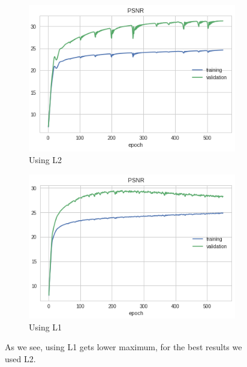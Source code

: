 \documentclass[12pt]{article}
\begin{document}
\begin{figure}[h!]
  \centering
  \begin{subfigure}[b]{0.4\linewidth}
    \includegraphics[width=\linewidth]{psnradam1d.png}
    \caption{Using L2}
  \end{subfigure}
  \begin{subfigure}[b]{0.4\linewidth}
    \includegraphics[width=\linewidth]{psnrL1in1d.png}
    \caption{Using L1}
  \end{subfigure}
  \caption{As we see, using L1 gets lower maximum, for the best results we used L2.}
  \label{fig:loss_compare_1d}
\end{figure}
\end{document}
